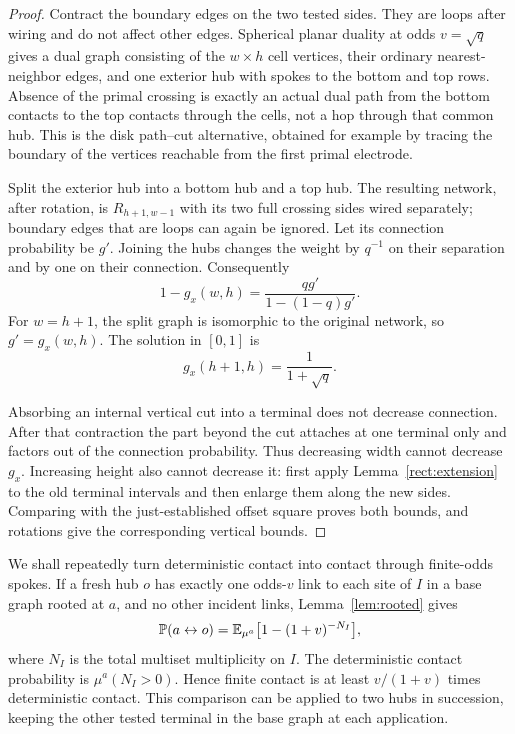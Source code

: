 \begin{proof}
Contract the boundary edges on the two tested sides.  They are loops
after wiring and do not affect other edges.  Spherical planar duality
at odds $v=\sqrt q$ gives a dual graph consisting of the $w\times h$
cell vertices, their ordinary nearest-neighbor edges, and one exterior
hub with spokes to the bottom and top rows.  Absence of the primal
crossing is exactly an actual dual path from the bottom contacts to the
top contacts through the cells, not a hop through that common hub.
This is the disk path--cut alternative, obtained for example by tracing
the boundary of the vertices reachable from the first primal electrode.

Split the exterior hub into a bottom hub and a top hub.  The resulting
network, after rotation, is $R_{h+1,w-1}$ with its two full crossing sides
wired separately; boundary edges that are loops can again be ignored.
Let its connection probability be $g'$.  Joining the hubs changes the
weight by $q^{-1}$ on their separation and by one on their connection.
Consequently
\begin{equation}
 1-g_x(w,h)=\frac{qg'}{1-(1-q)g'}.
 \label{rect:dual-relation}
\end{equation}
For $w=h+1$, the split graph is isomorphic to the original network, so
$g'=g_x(w,h)$.  The solution in $[0,1]$ is
\[
 g_x(h+1,h)=\frac{1}{1+\sqrt q}.
\]

Absorbing an internal vertical cut into a terminal does not decrease connection.
After that contraction the part beyond the cut attaches at one terminal
only and factors out of the connection probability.  Thus decreasing
width cannot decrease $g_x$.  Increasing height also cannot decrease it: first apply
Lemma~\ref{rect:extension} to the old terminal intervals and then enlarge
them along the new sides.  Comparing with the just-established offset
square proves both bounds, and rotations give the corresponding vertical
bounds.
\end{proof}

We shall repeatedly turn deterministic contact into contact through
finite-odds spokes. If a fresh hub $o$ has exactly one odds-$v$ link
to each site of $I$ in a base graph rooted at $a$, and no other incident
links, Lemma~\ref{lem:rooted} gives
\begin{equation}
 \mathbb P(a\leftrightarrow o)
 =\mathbb E_{\mu^a}\bigl[1-(1+v)^{-N_I}\bigr],
 \label{rect:spokes}
\end{equation}
where $N_I$ is the total multiset multiplicity on $I$.  The deterministic
contact probability is $\mu^a(N_I>0)$.  Hence finite contact is at least
$v/(1+v)$ times deterministic contact.  This comparison can be applied
to two hubs in succession, keeping the other tested terminal in the base
graph at each application.

